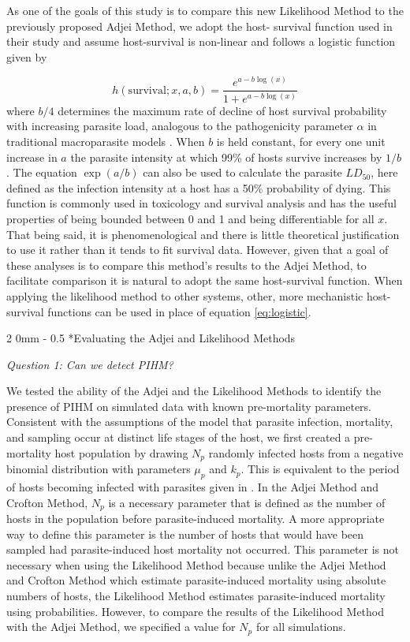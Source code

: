 \documentclass[12pt, a4paper]{article}
\makeatletter
\renewcommand{\subsection}{\@startsection
{subsection}%
{2}%
{0mm}%
{-\baselineskip}%
{0.5\baselineskip}%
{\normalfont\bf}} %
\makeatother
\begin{document}
As one of the goals of this study is to compare this new
Likelihood Method to the previously proposed Adjei Method, we adopt the host-
survival function used in their study and assume host-survival is non-linear and follows a logistic function given by

\begin{equation}
    h(\text{survival}; x, a, b) = \dfrac{e^{a - b \log(x)}}{1 + e^{a - b \log(x)}}
    \label{eq:logistic}
\end{equation}
where $b / 4$ determines the maximum rate of decline of
host survival probability with increasing parasite load, analogous to the pathogenicity parameter $\alpha$ in traditional macroparasite models \citep{AndersonandMay1978}.  When $b$ is held constant, for every one unit increase in $a$ the parasite intensity at which 99\% of hosts survive increases by $ 1/ b$.  The equation $\exp(a
/ b)$ can also be used to calculate the parasite $LD_{50}$, here defined as the
infection intensity at a host has a 50\% probability of dying.  This function is commonly used in toxicology and survival analysis and has the useful properties of being bounded between 0 and 1 and being differentiable for all $x$.  That being said, it is phenomenological and there is little theoretical justification to use it rather than it tends to fit survival data. However, given that a goal of these analyses is to
compare this method's results to the Adjei Method, to facilitate comparison it is natural
to adopt the same host-survival function.  When
applying the likelihood method to other systems, other, more mechanistic host-survival functions can be used in place of equation \ref{eq:logistic}.

\subsection*{Evaluating the Adjei and Likelihood Methods}

\emph{Question 1: Can we detect PIHM?}

We tested the ability of the Adjei and the Likelihood Methods to identify the presence of PIHM on simulated data with known pre-mortality parameters. Consistent with the assumptions of the model that parasite infection, mortality, and sampling occur at distinct life stages of the host, we first created a pre-mortality host population by drawing $N_p$ randomly infected hosts from a
negative binomial distribution with parameters $\mu_p$ and $k_p$. This is equivalent to the period of hosts becoming infected with parasites given in \cite{Adjei1986}.  In the Adjei Method and Crofton Method, $N_p$ is a necessary parameter that is defined as the number of hosts in the population before parasite-induced mortality.  A more appropriate way to define this parameter is the number of hosts that would have been sampled had parasite-induced host mortality not occurred.  This parameter is not necessary when using the Likelihood Method because unlike the Adjei Method and Crofton Method which estimate parasite-induced mortality using absolute numbers of hosts, the Likelihood Method estimates parasite-induced mortality using probabilities. However, to compare the results of the Likelihood Method with the Adjei Method, we specified a value for $N_p$ for all simulations.
\end{document}
